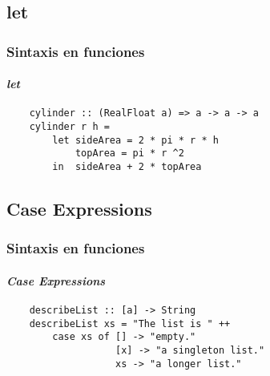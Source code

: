 \subsection{let}
\begin{frame}[fragile]
  \frametitle{Sintaxis en funciones}
  \framesubtitle{\emph{let}}
  \begin{verbatim}
    cylinder :: (RealFloat a) => a -> a -> a
    cylinder r h =
        let sideArea = 2 * pi * r * h
            topArea = pi * r ^2
        in  sideArea + 2 * topArea
  \end{verbatim}
\end{frame}
\subsection{Case Expressions}
\begin{frame}[fragile]
  \frametitle{Sintaxis en funciones}
  \framesubtitle{\emph{Case Expressions}}
  \begin{verbatim}
    describeList :: [a] -> String
    describeList xs = "The list is " ++
        case xs of [] -> "empty."
                   [x] -> "a singleton list."
                   xs -> "a longer list."
  \end{verbatim}
\end{frame}